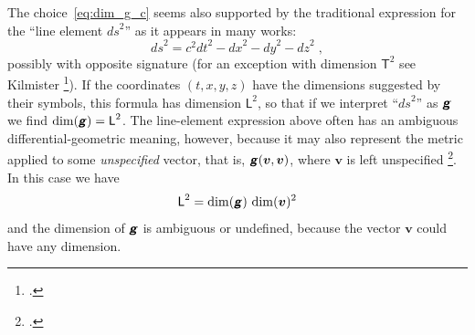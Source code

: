\documentclass[a4paper,12pt,onecolumn,oneside,article,british]{memoir}
\newcommand*{\mathte}[1]{\textbf{\textit{\textsf{#1}}}}
\newcommand*{\citep}{\footcites}
\newcommand*{\sect}{\S}%
\newcommand*{\chap}{ch.}%
\newcommand*{\cf}{{cf.}}
\newcommand*{\Le}{\textsf{L}}
\newcommand*{\Ti}{\textsf{T}}
\newcommand*{\yg}{\mathte{g}}
\newcommand*{\ygc}{\mathte{g}}
\newcommand*{\yv}{\bm{v}}
\newcommand*{\ds}{\mathit{ds}}
\begin{document}
The choice~\eqref{eq:dim_g_c} seems also supported by the traditional
expression for the \enquote{line element $\ds^{2}$} as it appears in many
works:
\begin{equation}
  \label{eq:line_elem}
  \ds^{2} = c^2\mathit{dt}^2 - \mathit{dx}^2 -\mathit{dy}^2 - \mathit{dz}^2
  \;,
\end{equation}
possibly with opposite signature (for an exception with dimension $\Ti^{2}$
see Kilmister \citep[\chap~II p.~25]{kilmister1973}{kilmister1973}). If the
coordinates $(t,x,y,z)$ have the dimensions suggested by their symbols,
this formula has dimension $\Le^{2}$, so that if we interpret
\enquote{$\ds^{2}$} as $\ygc$ we find $\dim(\ygc) = \Le^{2}$. The
line-element expression above often has an ambiguous differential-geometric
meaning, however, because it may also represent the metric applied to some
\emph{unspecified} vector, that is, $\yg(\yv,\yv)$, where $\yv$ is left
unspecified \citep[\cf][Box~3.2~D p.~77]{misneretal1970_r1973}. In this
case we have
\begin{equation}
  \label{eq:line_elem_dim_ambiguous}
  \Le^{2} = \dim(\yg)\,\dim(\yv)^{2}
\end{equation}
and the dimension of $\yg$ is ambiguous or undefined, because the vector
$\yv$ could have any dimension.%

\medskip
\end{document}
